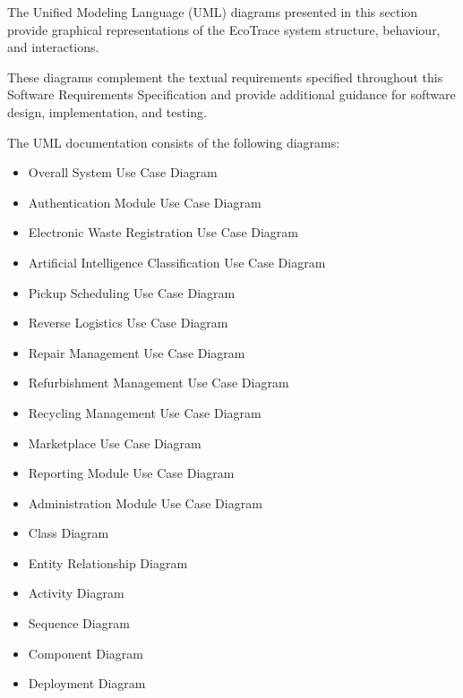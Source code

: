 The Unified Modeling Language (UML) diagrams presented in this section
provide graphical representations of the EcoTrace system structure,
behaviour, and interactions.

These diagrams complement the textual requirements specified
throughout this Software Requirements Specification and provide
additional guidance for software design, implementation, and testing.

The UML documentation consists of the following diagrams:

\begin{itemize}

\item Overall System Use Case Diagram

\item Authentication Module Use Case Diagram

\item Electronic Waste Registration Use Case Diagram

\item Artificial Intelligence Classification Use Case Diagram

\item Pickup Scheduling Use Case Diagram

\item Reverse Logistics Use Case Diagram

\item Repair Management Use Case Diagram

\item Refurbishment Management Use Case Diagram

\item Recycling Management Use Case Diagram

\item Marketplace Use Case Diagram

\item Reporting Module Use Case Diagram

\item Administration Module Use Case Diagram

\item Class Diagram

\item Entity Relationship Diagram

\item Activity Diagram

\item Sequence Diagram

\item Component Diagram

\item Deployment Diagram

\end{itemize}

